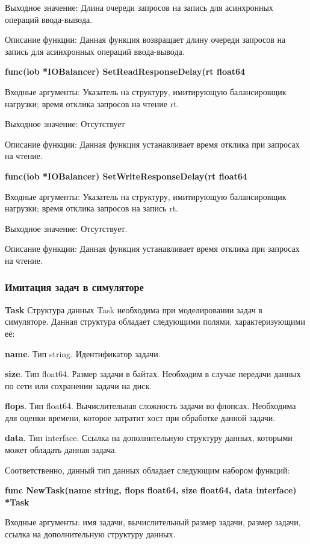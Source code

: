 Выходное значение: Длина очереди запросов на запись для асинхронных операций ввода-вывода. 

Описание функции: Данная функция возвращает длину очереди запросов на запись для асинхронных операций ввода-вывода.

\textbf{func(iob *IOBalancer) SetReadResponseDelay(rt float64}

Входные аргументы: Указатель на структуру, имитирующую балансировщик нагрузки; время отклика запросов на чтение rt.

Выходное значение: Отсутствует 

Описание функции: Данная функция устанавливает время отклика при запросах на чтение.

\textbf{func(iob *IOBalancer) SetWriteResponseDelay(rt float64}

Входные аргументы: Указатель на структуру, имитирующую балансировщик нагрузки; время отклика запросов на запись rt.

Выходное значение: Отсутствует.

Описание функции: Данная функция устанавливает время отклика при запросах на чтение.

\subsubsection{Имитация задач в симуляторе}
\textbf{Task}
Структура данных Task необходима при моделировании задач в симуляторе. Данная структура обладает следующими полями, характеризующими  её:

\textbf{	name}. Тип  string. Идентификатор задачи.

\textbf{	size}. Тип float64. Размер задачи в байтах. Необходим в случае передачи данных по сети или сохранении задачи на диск.

\textbf{	flops}. Тип   float64. Вычислительная сложность задачи во флопсах. Необходима для оценки времени, которое затратит хост при обработке данной задачи.

\textbf{	data}. Тип interface{}. Ссылка на дополнительную структуру данных, которыми может обладать данная задача. 

Соответственно, данный тип данных обладает следующим набором функций:

\textbf{func NewTask(name string, flops float64, size float64, data interface{}) *Task}

Входные аргументы: имя задачи, вычислительный размер задачи, размер задачи, ссылка на дополнительную структуру данных.

